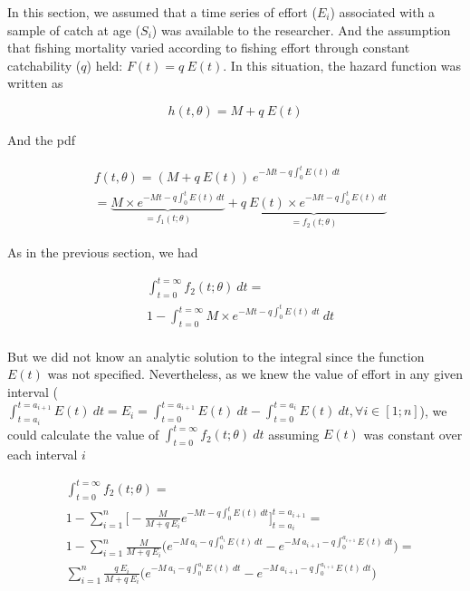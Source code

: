 In this section, we assumed that a time series of effort ($E_{i}$) associated with a sample of catch at age ($S_{i}$) was available to the researcher. And the assumption that fishing mortality varied according to fishing effort through constant catchability ($q$) held: $F(t) = q \ E(t)$. In this situation, the hazard function was written as

\begin{equation}
h(t,\theta) = M + q \ E(t)
\end{equation} 

And the pdf

\begin{align}
& f(t, \theta) = ( M + q \ E(t)) \ e^{-Mt-q\int_{0}^{t}E(t) \ dt} \\
             &= \underbrace{M \times e^{-Mt-q\int_{0}^{t}E(t) \ dt}}_{=f_{1}(t; \theta)} + \underbrace{q \ E(t) \times e^{-Mt-q\int_{0}^{t}E(t) \ dt}}_{=f_{2}(t; \theta)}
\end{align}

As in the previous section, we had

\begin{align}
& \int_{t=0}^{t=\infty} f_{2}(t; \theta) \ dt = \\
& 1 - \int_{t=0}^{t=\infty} M \times e^{-Mt-q\int_{0}^{t}E(t) \ dt} \ dt \\
\end{align}

But we did not know an analytic solution to the integral since the function $E(t)$ was not specified. Nevertheless, as we knew the value of effort in any given interval ($\int_{t=a_{i}}^{t=a_{i+1}}  E(t) \ dt = E_{i} = \int_{t=0}^{t=a_{i+1}} E(t) \ dt - \int_{t=0}^{t=a_{i}} E(t) \ dt, \forall i \in [1; n]$), we could calculate the value of $\int_{t=0}^{t=\infty} f_{2}(t; \theta) \ dt$ assuming $E(t)$ was constant over each interval $i$ 

\begin{align}
& \int_{t=0}^{t=\infty} f_{2}(t; \theta) = \\
& 1 - \sum_{i=1}^{n} \bigl [ -\frac{M}{M+q \ E_{i}} e^{-Mt-q\int_{0}^{t}E(t) \ dt} \bigr ]_{t=a_{i}}^{t=a_{i+1}} = \\
& 1 - \sum_{i=1}^{n} \frac{M}{M+q \ E_{i}} \bigl ( e^{-M \ a_{i}-q \int_{0}^{a_{i}}E(t) \ dt} - e^{-M \ a_{i+1}-q \int_{0}^{a_{i+1}} E(t) \ dt} \bigr ) = \\
& \sum_{i=1}^{n} \frac{q \ E_{i}}{M+q \ E_{i}} \bigl ( e^{-M \ a_{i}-q\int_{0}^{a_{i}}E(t) \ dt} - e^{-M \ a_{i+1}-q\int_{0}^{a_{i+1}}E(t) \ dt} \bigr )
\end{align}


